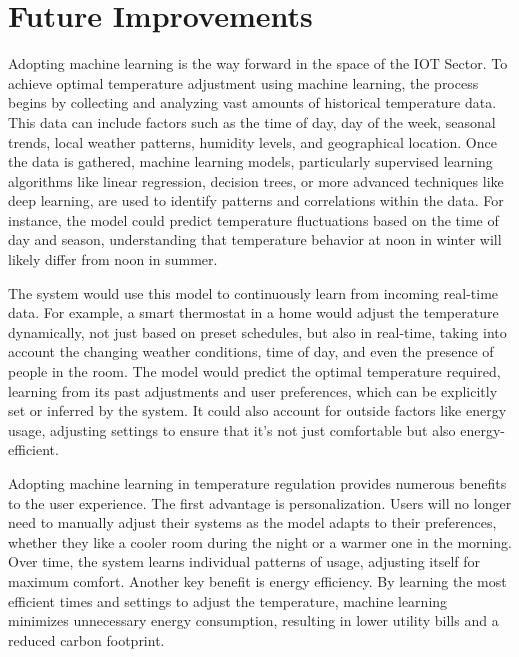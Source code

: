 \documentclass[a4paper]{scrartcl}
\begin{document}
\section{Future Improvements}
Adopting machine learning is the way forward in the space of the IOT Sector. To achieve optimal temperature adjustment using machine learning, the process begins by collecting and analyzing vast amounts of historical temperature data. This data can include factors such as the time of day, day of the week, seasonal trends, local weather patterns, humidity levels, and geographical location.\cite{r20} Once the data is gathered, machine learning models, particularly supervised learning algorithms like linear regression, decision trees, or more advanced techniques like deep learning, are used to identify patterns and correlations within the data. For instance, the model could predict temperature fluctuations based on the time of day and season, understanding that temperature behavior at noon in winter will likely differ from noon in summer.

The system would use this model to continuously learn from incoming real-time data. For example, a smart thermostat in a home would adjust the temperature dynamically, not just based on preset schedules, but also in real-time, taking into account the changing weather conditions, time of day, and even the presence of people in the room. The model would predict the optimal temperature required, learning from its past adjustments and user preferences, which can be explicitly set or inferred by the system. It could also account for outside factors like energy usage, adjusting settings to ensure that it’s not just comfortable but also energy-efficient.

Adopting machine learning in temperature regulation provides numerous benefits to the user experience. The first advantage is personalization. Users will no longer need to manually adjust their systems as the model adapts to their preferences, whether they like a cooler room during the night or a warmer one in the morning. Over time, the system learns individual patterns of usage, adjusting itself for maximum comfort. Another key benefit is energy efficiency. By learning the most efficient times and settings to adjust the temperature, machine learning minimizes unnecessary energy consumption, resulting in lower utility bills and a reduced carbon footprint. 
\end{document}
